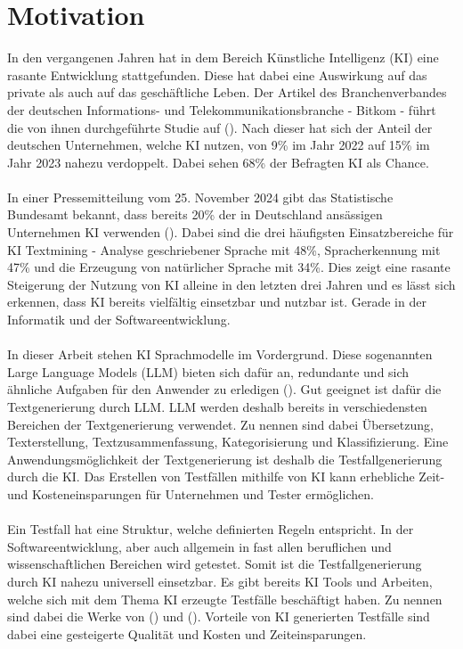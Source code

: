 \documentclass[12pt,toc=bib,toc=listof]{scrreprt}
\begin{document}
\section{Motivation} %
\label{sec:motivation}
In den vergangenen Jahren hat in dem Bereich Künstliche Intelligenz (KI) eine rasante Entwicklung stattgefunden. Diese hat dabei eine Auswirkung auf das private als auch auf das geschäftliche Leben. Der Artikel des Branchenverbandes der deutschen Informations- und Telekommunikationsbranche - Bitkom - führt die von ihnen durchgeführte Studie auf (\cite{StreimHecker2023}). Nach dieser hat sich der Anteil der deutschen Unternehmen, welche KI nutzen, von 9\% im Jahr 2022 auf 15\% im Jahr 2023 nahezu verdoppelt. Dabei sehen 68\% der Befragten KI als Chance.\\
\\
In einer Pressemitteilung vom 25. November 2024 gibt das Statistische Bundesamt bekannt, dass bereits 20\% der in Deutschland ansässigen Unternehmen KI verwenden (\cite{StatistischesBundesamt2024}). Dabei sind die drei häufigsten Einsatzbereiche für KI Textmining - Analyse geschriebener Sprache mit 48\%, Spracherkennung mit 47\% und die Erzeugung von natürlicher Sprache mit 34\%. Dies zeigt eine rasante Steigerung der Nutzung von KI alleine in den letzten drei Jahren und es lässt sich erkennen, dass KI bereits vielfältig einsetzbar und nutzbar ist. Gerade in der Informatik und der Softwareentwicklung.\\
\\
In dieser Arbeit stehen KI Sprachmodelle im Vordergrund. Diese sogenannten Large Language Models (LLM) bieten sich  dafür an, redundante und sich ähnliche Aufgaben für den Anwender zu erledigen (\cite{Kerner2024}). Gut geeignet ist dafür die Textgenerierung durch LLM. LLM werden deshalb bereits in verschiedensten Bereichen der Textgenerierung verwendet. Zu nennen sind dabei Übersetzung, Texterstellung, Textzusammenfassung, Kategorisierung und Klassifizierung. Eine Anwendungsmöglichkeit der Textgenerierung ist deshalb die Testfallgenerierung durch die KI. Das Erstellen von Testfällen mithilfe von KI kann erhebliche Zeit- und Kosteneinsparungen für Unternehmen und Tester ermöglichen.\\
\\
Ein Testfall hat eine Struktur, welche definierten Regeln entspricht. In der Softwareentwicklung, aber auch allgemein in fast allen beruflichen und wissenschaftlichen Bereichen wird getestet. Somit ist die Testfallgenerierung durch KI nahezu universell einsetzbar. Es gibt bereits KI Tools und Arbeiten, welche sich mit dem Thema KI erzeugte Testfälle beschäftigt haben. Zu nennen sind dabei die Werke von (\cite{Bozic2022}) und (\cite{WeingartzSuleymanov2024}). Vorteile von KI generierten Testfälle sind dabei eine gesteigerte Qualität und Kosten und Zeiteinsparungen.\\
\end{document}
